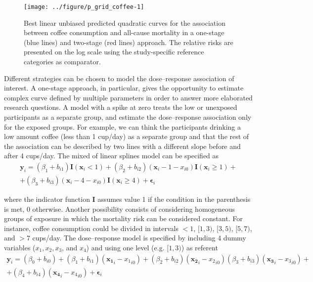 \documentclass[11pt,a4paper,twoside,openany]{book}\usepackage{knitr}
\begin{document}
{\begin{knitrout}
\begin{figure}[ht!]
{\centering \texttt{[image: ../figure/p\_grid\_coffee-1]} 

}

\caption[Best linear unbiased predicted quadratic curves for the association between coffee consumption and all-cause mortality in a one-stage (blue lines) and two-stage (red lines) approach]{Best linear unbiased predicted quadratic curves for the association between coffee consumption and all-cause mortality in a one-stage (blue lines) and two-stage (red lines) approach. The relative risks are presented on the log scale using the study-specific reference categories as comparator.}\label{fig:p_grid_coffee}
\end{figure}


\end{knitrout}



Different strategies can be chosen to model the dose--response association of interest. A one-stage approach, in particular, gives the opportunity to estimate complex curve defined by multiple parameters in order to answer more elaborated research questions. A model with a spike at zero treats the low or unexposed participants as a separate group, and estimate the dose--response association only for the exposed groups. For example, we can think the participants drinking a low amount coffee (less than 1 cup/day) as a separate group and that the rest of the association can be described by two lines with a different slope before and after 4 cups/day. The mixed of linear splines model can be specified as
\begin{multline*}
\mathbf{y}_i = (\beta_1 + b_{i1}) \mathbf{I} (\mathbf{x}_{i} < 1) +(\beta_2  + b_{i2}) (\mathbf{x}_{i} - 1 - x_{i0})\mathbf{I}(\mathbf{x}_{i} \ge 1)+ \\  +(\beta_3  + b_{i3}) (\mathbf{x}_{i} - 4 - x_{i0})\mathbf{I}(\mathbf{x}_{i} \ge 4) + \boldsymbol{\epsilon}_{i}
\label{spike_zero}
\end{multline*}

\noindent where the indicator function $\mathbf{I}$ assumes value 1 if the condition in the parenthesis  is met, 0 otherwise.
\noindent Another possibility consists of considering homogeneous groups of exposure in which the mortality risk can be considered constant. For instance, coffee consumption could be divided in intervals $< 1$, $[1, 3)$, $[3, 5)$, $[5, 7)$, and $> 7$ cups/day. The dose--response model is specified by including 4 dummy variables ($x_1, x_2, x_3$, and $x_4$) and using one level (e.g. $[1, 3)$) as referent
\begin{multline*}
\mathbf{y}_i =  (\beta_0 + b_{i0}) + (\beta_1 + b_{i1}) (\mathbf{x_1}_{i} - {x_1}_{i0}) + (\beta_2  + b_{i2}) (\mathbf{x_2}_{i} - {x_2}_{i0})
(\beta_3 + b_{i3}) (\mathbf{x_3}_{i} - {x_3}_{i0}) + \\  + (\beta_4 + b_{i4}) (\mathbf{x_4}_{i} - {x_4}_{i0}) + \boldsymbol{\epsilon}_{i}
\end{multline*}

}
\end{document}
